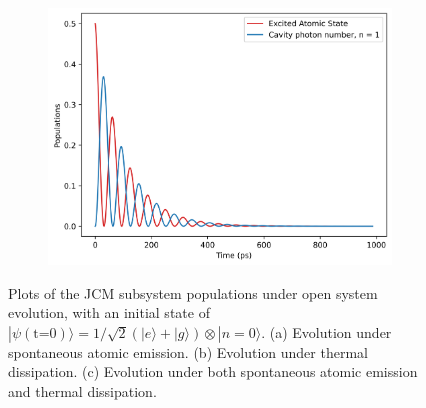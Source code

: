 \documentclass[11pt]{article}
\begin{document}
\begin{figure}[H]
    \vspace{0.5cm}
    
    \begin{subfigure}{0.45\textwidth}
        \centering
        \includegraphics[width=\linewidth]{Research Project/Code/results/JCM/OQS_Pop_Both_eg.png}
        \caption{}
        \label{fig:JCM_OQS_Pop_Both_eg}
    \end{subfigure}
    \hfill

    \caption{Plots of the JCM subsystem populations under open system evolution, with an initial state of $|\psi (\text{t=0})\rangle = 1/\sqrt{2}(|e\rangle + |g\rangle)\otimes|n=0\rangle$. (a) Evolution under spontaneous atomic emission. (b) Evolution under thermal dissipation. (c) Evolution under both spontaneous atomic emission and thermal dissipation.}
    \label{fig:JCM_OQS_Pop_eg}
\end{figure}
\end{document}
